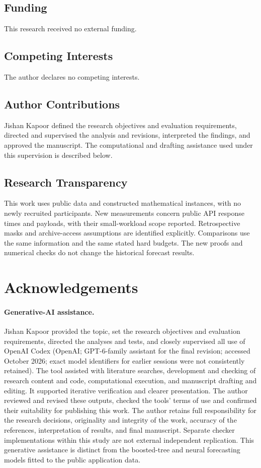 \documentclass[12pt]{article}
\begin{document}
\subsection*{Funding}
This research received no external funding.

\subsection*{Competing Interests}
The author declares no competing interests.

\subsection*{Author Contributions}
Jishan Kapoor defined the research objectives and evaluation requirements,
directed and supervised the analysis and revisions, interpreted the findings,
and approved the manuscript. The computational and drafting assistance used
under this supervision is described below.

\subsection*{Research Transparency}
This work uses public data and constructed mathematical instances, with
no newly recruited participants. New measurements concern public API
response times and payloads, with their small-workload scope reported. Retrospective masks and
archive-access assumptions are identified explicitly. Comparisons use
the same information and the same stated hard budgets. The new proofs
and numerical checks do not change the historical forecast results.

\section*{Acknowledgements}
\paragraph{Generative-AI assistance.}
Jishan Kapoor provided the topic, set the research objectives and evaluation
requirements, directed the analyses and tests, and closely supervised all
use of OpenAI Codex (OpenAI; GPT-6-family assistant for the final revision;
accessed October 2026; exact model identifiers for earlier sessions were
not consistently retained). The tool assisted with literature searches,
development and checking of research content and code, computational
execution, and manuscript drafting and editing. It supported iterative
verification and clearer presentation. The author reviewed and revised
these outputs, checked the tools' terms of use and confirmed their suitability
for publishing this work. The author retains full responsibility for the
research decisions, originality and integrity of the work, accuracy of the
references, interpretation of results, and final manuscript. Separate checker
implementations within this study are not external independent replication.
This generative assistance is distinct from the boosted-tree and neural
forecasting models fitted to the public application data.
\end{document}
